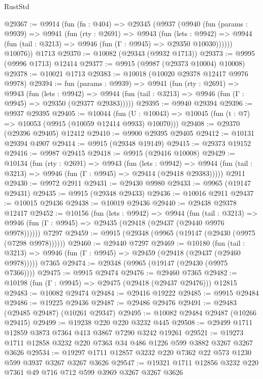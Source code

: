 \begin{lexlean}{RustStd}
\begin{coremodule}
{\begin{coremodule}
{{{{{{{{{{{{{{{{{{{{{{{{{@29367 := @9914
    (fun (fn : @404) =>
    @29345
      (@9937
        (@9940
          (fun (params : @9939) =>
          @9941
            (fun (rty : @2691) =>
            @9943
              (fun (lets : @9942) =>
              @9944 (fun (tail : @3213) => @9946 (fun (Γ : @9945) => @29350 @10030))))))
        @10076))
    @1713
@29370 := @10082 (@29343 (@9932 @1713))
@29373 := @9995 (@9996 @1713) @12414
@29377 := @9915 (@9987 (@29373 @10004) @10008)
@29378 := @10021 @1713
@29383 := @10018 (@10020 @29378 @12417 @9976 @9978)
@29394 := fun (params : @9939) =>
  @9941
    (fun (rty : @2691) =>
    @9943
      (fun (lets : @9942) =>
      @9944 (fun (tail : @3213) => @9946 (fun (Γ : @9945) => @29350 (@29377 @29383)))))
@29395 := @9940 @29394
@29396 := @9937 @29395
@29405 := @10044
    (fun (U : @10043) => @10045 (fun (t : @7) => @10053 (@9915 (@10059 @12414 @9933) @10070)))
@29408 := @29370 (@29396 @29405) @12412
@29410 := @9900 @29395 @29405
@29412 := @10131 @29394 @4907
@29414 := @9915 (@29348 @19149)
@29415 := @29373 @19152
@29416 := @9987 @29415
@29418 := @9915 (@29416 @10008)
@29429 := @10134
    (fun (rty : @2691) =>
    @9943
      (fun (lets : @9942) =>
      @9944 (fun (tail : @3213) => @9946 (fun (Γ : @9945) => @29414 (@29418 @29383)))))
    @2911
@29430 := @9972 @2911
@29431 := @29430 @9980
@29433 := @9965 (@19147 @29431)
@29435 := @9915 (@29348 @29433)
@29436 := @10016 @2911
@29437 := @10015 @29436
@29438 := @10019 @29436
@29440 := @29438 @29378 @12417
@29452 := @10156
    (fun (lets : @9942) =>
    @9944
      (fun (tail : @3213) =>
      @9946 (fun (Γ : @9945) => @29435 (@29418 (@29437 (@29440 @9976 @9978))))))
    @7297
@29459 := @9915 (@29348 (@9965 (@19147 (@29430 (@9975 (@7298 @9978))))))
@29460 := @29440 @7297
@29469 := @10180
    (fun (tail : @3213) => @9946 (fun (Γ : @9945) => @29459 (@29418 (@29437 (@29460 @9978)))))
    @7365
@29474 := @29348 (@9965 (@19147 (@29430 (@9975 @7366))))
@29475 := @9915 @29474
@29476 := @29460 @7365
@29482 := @10198 (fun (Γ : @9945) => @29475 (@29418 (@29437 @29476))) @12815
@29483 := @10082 @29474
@29484 := @29416 @19222
@29485 := @9915 @29484
@29486 := @19225 @29436
@29487 := @29486 @29476
@29491 := @29483 (@29485 @29487) (@10261 @29347)
@29495 := @10082 @29484 @29487 (@10266 @29415)
@29499 := @19238 @220 @220 @3232 @445
@29508 := @29499 @1711 @12859 @3873 @7364 @413 @3867 @7290 @3242 @19261
@29521 := @19273 @1711 @12858 @3232 @220 @7363 @34 @486 @1226 @599 @3882 @3267 @3267 @3626
@29534 := @19297 @1711 @12857 @3232 @220 @7362 @22 @573 @1230 @599 @3937 @3267 @3267 @3626
@29547 := @19321 @1711 @12856 @3232 @220 @7361 @49 @716 @712 @599 @3969 @3267 @3267 @3626
}}}}}}}}}}}}}}}}}}}}}}}}}
\end{coremodule}}
\end{coremodule}
\end{lexlean}
